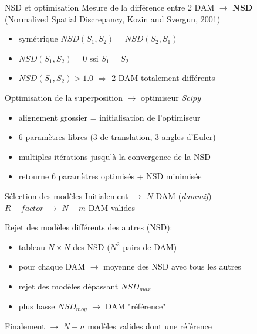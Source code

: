 \documentclass{beamer}
\begin{document}
\begin{frame}{NSD et optimisation}
Mesure de la diff\'erence entre 2 DAM $\longrightarrow$ \textbf{NSD}\\
(Normalized Spatial Discrepancy, Kozin and Svergun, 2001)
\begin{itemize}
\item sym\'etrique $NSD(S_{1},S_{2}) = NSD(S_{2},S_{1})$
\item $NSD(S_{1},S_{2}) = 0$ ssi $S_{1} = S_{2}$
\item $NSD(S_{1},S_{2}) > 1.0$ $\Rightarrow$ 2 DAM totalement diff\'erents
\end{itemize}

\vspace{0.2cm}

Optimisation de la superposition $\longrightarrow$ optimiseur \textit{Scipy}
\begin{itemize}
\item alignement grossier = initialisation de l'optimiseur
\item 6 param\`etres libres (3 de translation, 3 angles d'Euler)
\item multiples it\'erations jusqu'\`a la convergence de la NSD
\item retourne 6 param\`etres optimis\'es + NSD minimis\'ee
\end{itemize}

\end{frame}

\begin{frame}{S\'election des mod\`eles}
Initialement $\longrightarrow$ $N$ DAM (\textit{dammif})\\
$R-factor$ $\longrightarrow$ $N-m$ DAM valides\\

\vspace{0.3cm}

Rejet des mod\`eles diff\'erents des autres (NSD):
\begin{itemize}
\item tableau $N \times N$ des NSD ($N^{2}$ pairs de DAM)
\item pour chaque DAM $\rightarrow$ moyenne des NSD avec tous les autres
\item rejet des mod\`eles d\'epassant $NSD_{max}$
\item plus basse $NSD_{moy}$ $\rightarrow$ DAM "r\'ef\'erence"
\end{itemize}

\vspace{0.3cm}

Finalement $\longrightarrow$ $N-n$ mod\`eles valides dont une r\'ef\'erence

\end{frame}
\end{document}
